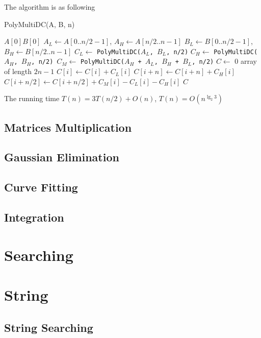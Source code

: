 				The algorithm is as following
				\begin{algorithm}[h]
					\caption{PolyMultiDC(A, B, n)}
					\begin{algorithmic}[1]
							\Return $A[0]B[0]$
						\EndIf
						\State $A_L \gets A[0 .. n/2 - 1]$, $A_H \gets A[n/2 .. n - 1]$
						\State $B_L \gets B[0 .. n/2 - 1]$, $B_H \gets B[n/2 .. n - 1]$
						\State $C_L \gets $ \texttt{PolyMultiDC($A_L$, $B_L$, n/2)}
						\State $C_H \gets $ \texttt{PolyMultiDC($A_H$, $B_H$, n/2)}\
						\State $C_M \gets $ \texttt{PolyMultiDC($A_H$ + $A_L$, $B_H$ + $B_L$, n/2)}
						\State $C \gets $ 0 array of length $2n-1$
							\State $C[i] \gets C[i] + C_L[i]$
							\State $C[i + n] \gets C[i + n] + C_H[i]$
							\State $C[i + n/2] \gets C[i + n/2] + C_M[i] - C_L[i] - C_H[i]$
						\EndFor
						\Return $C$
					\end{algorithmic}
				\end{algorithm}

				The running time $T(n) = 3T(n/2) + O(n)$, $T(n) = O(n^{\lg_2 3})$

			\section{Matrices Multiplication}

			\section{Gaussian Elimination}

			\section{Curve Fitting}

			\section{Integration}

		\chapter{Searching}

		\chapter{String}
			\section{String Searching}

